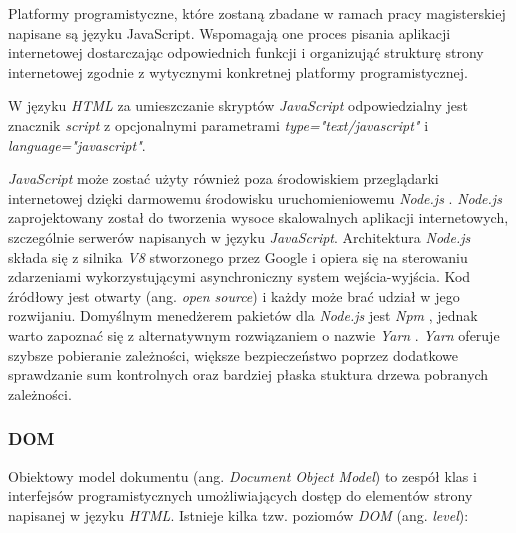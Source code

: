 \documentclass[polish, twoside, 12pt]{mwart}
\begin{document}
Platformy programistyczne, które zostaną zbadane w ramach pracy magisterskiej napisane są języku JavaScript. Wspomagają one proces pisania aplikacji internetowej dostarczając odpowiednich funkcji i organizująć strukturę strony internetowej zgodnie z wytycznymi konkretnej platformy programistycznej.

W języku \emph{HTML} za umieszczanie skryptów \emph{JavaScript} odpowiedzialny jest znacznik \emph{script} z opcjonalnymi parametrami \emph{type="text/javascript"} i \emph{language="javascript"}.

\emph{JavaScript} może zostać użyty również poza środowiskiem przeglądarki internetowej dzięki darmowemu środowisku uruchomieniowemu \emph{Node.js} \cite{node.js}. \emph{Node.js} zaprojektowany został do tworzenia wysoce skalowalnych aplikacji internetowych, szczególnie serwerów napisanych w języku \emph{JavaScript}. Architektura \emph{Node.js} składa się z silnika \emph{V8} \cite{v8} stworzonego przez Google i opiera się na sterowaniu zdarzeniami wykorzystującymi asynchroniczny system wejścia-wyjścia. Kod źródłowy jest otwarty (ang. \emph{open source}) i każdy może brać udział w jego rozwijaniu. Domyślnym menedżerem pakietów dla \emph{Node.js} jest \emph{Npm} \cite{npm}, jednak warto zapoznać się z alternatywnym rozwiązaniem o nazwie \emph{Yarn} \cite{yarn}. \emph{Yarn} oferuje szybsze pobieranie zależności, większe bezpieczeństwo poprzez dodatkowe sprawdzanie sum kontrolnych oraz bardziej płaska stuktura drzewa pobranych zależności.

\subsubsection{DOM} \label{dom}

Obiektowy model dokumentu (ang. \emph{Document Object Model}) to zespół klas i interfejsów programistycznych umożliwiających dostęp do elementów strony napisanej w języku \emph{HTML}. Istnieje kilka tzw. poziomów \emph{DOM} (ang. \emph{level}):
\end{document}
